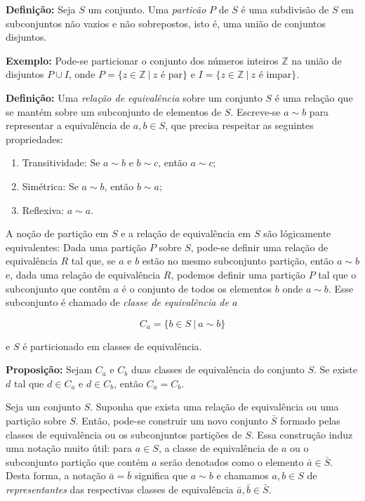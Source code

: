 \documentclass[11pt]{article}
\providecommand{\tightlist}{%
      \setlength{\itemsep}{0pt}\setlength{\parskip}{0pt}}
\begin{document}
\textbf{Definição:} Seja \(S\) um conjunto. Uma \emph{particão} \(P\) de
\(S\) é uma subdivisão de \(S\) em subconjuntos não vazios e não
sobrepostos, isto é, uma união de conjuntos disjuntos.

\textbf{Exemplo:} Pode-se particionar o conjunto dos números inteiros
\(\mathbb{Z}\) na união de disjuntos \(P\cup I\), onde
\(P = \{z \in \mathbb{Z} \ |\ z \text{ é par}\}\) e
\(I = \{z \in \mathbb{Z} \ |\ z \text{ é impar}\}\).

\textbf{Definição:} Uma \emph{relação de equivalência} sobre um conjunto
\(S\) é uma relação que se mantém sobre um subconjunto de elementos de
\(S\). Escreve-se \(a\sim b\) para representar a equivalência de
\(a, b \in S\), que precisa respeitar as seguintes propriedades:

\begin{enumerate}
\def\labelenumi{\arabic{enumi}.}
\tightlist
\item
  Transitividade: Se \(a\sim b\) e \(b\sim c\), então \(a\sim c\);
\item
  Simétrica: Se \(a\sim b\), então \(b\sim a\);
\item
  Reflexiva: \(a\sim a\).
\end{enumerate}

A noção de partição em \(S\) e a relação de equivalência em \(S\) são
lógicamente equivalentes: Dada uma partição \(P\) sobre \(S\), pode-se
definir uma relação de equivalência \(R\) tal que, se \(a\) e \(b\)
estão no mesmo subconjunto partição, então \(a\sim b\) e, dada uma
relação de equivalência \(R\), podemos definir uma partição \(P\) tal
que o subconjunto que contêm \(a\) é o conjunto de todos os elementos
\(b\) onde \(a\sim b\). Esse subconjunto é chamado de \emph{classe de
equivalência de \(a\)}

\[C_a = \{b\in S \ | \ a\sim b\}\]

e \(S\) é particionado em classes de equivalência.

\textbf{Proposição:} Sejam \(C_a\) e \(C_b\) duas classes de
equivalência do conjunto \(S\). Se existe \(d\) tal que \(d\in C_a\) e
\(d\in C_b\), então \(C_a = C_b\).

Seja um conjunto \(S\). Suponha que exista uma relação de equivalência
ou uma partição sobre \(S\). Então, pode-se construir um novo conjunto
\(\bar{S}\) formado pelas classes de equivalência ou os subconjuntos
partições de \(S\). Essa construção induz uma notação muito útil: para
\(a\in S\), a classe de equivalência de \(a\) ou o subconjunto partição
que contém \(a\) serão denotados como o elemento
\(\bar{a} \in \bar{S}\). Desta forma, a notação \(\bar{a} = \bar{b}\)
significa que \(a \sim b\) e chamamos \(a,b \in S\) de
\emph{representantes} das respectivas classes de equivalência
\(\bar{a}, \bar{b} \in \bar{S}\).
\end{document}
